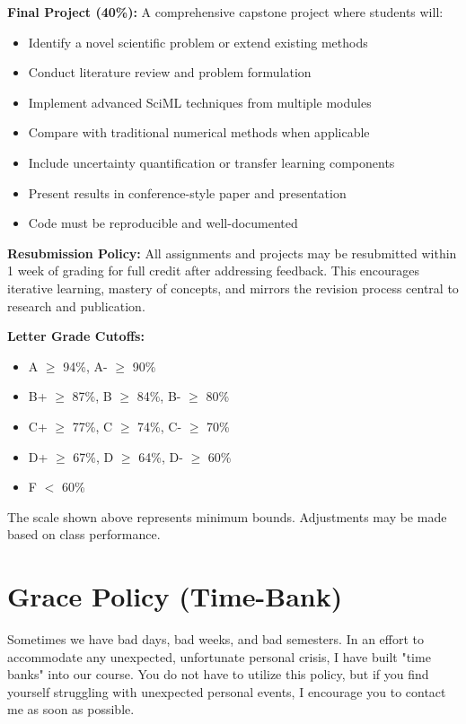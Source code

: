 \documentclass[11pt,fourier]{article}
\begin{document}
	\noindent\textbf{Final Project (40\%):} A comprehensive capstone project where students will:
	\begin{itemize}
		\item Identify a novel scientific problem or extend existing methods
		\item Conduct literature review and problem formulation
		\item Implement advanced SciML techniques from multiple modules
		\item Compare with traditional numerical methods when applicable
		\item Include uncertainty quantification or transfer learning components
		\item Present results in conference-style paper and presentation
		\item Code must be reproducible and well-documented
	\end{itemize}
	
	\noindent\textbf{Resubmission Policy:} All assignments and projects may be resubmitted within 1 week of grading for full credit after addressing feedback. This encourages iterative learning, mastery of concepts, and mirrors the revision process central to research and publication.
	
	\noindent\textbf{Letter Grade Cutoffs:}
	\begin{itemize}
		\item A $\ge$ 94\%, A- $\ge$ 90\%
		\item B+ $\ge$ 87\%, B $\ge$ 84\%, B- $\ge$ 80\%
		\item C+ $\ge$ 77\%, C $\ge$ 74\%, C- $\ge$ 70\%
		\item D+ $\ge$ 67\%, D $\ge$ 64\%, D- $\ge$ 60\%
		\item F $<$ 60\%
	\end{itemize}
	
	The scale shown above represents minimum bounds. Adjustments may be made based on class performance.
	
	\section*{Grace Policy (Time-Bank)}
	Sometimes we have bad days, bad weeks, and bad semesters. In an effort to accommodate any unexpected, unfortunate personal crisis, I have built "time banks" into our course. You do not have to utilize this policy, but if you find yourself struggling with unexpected personal events, I encourage you to contact me as soon as possible.
	
\end{document}
